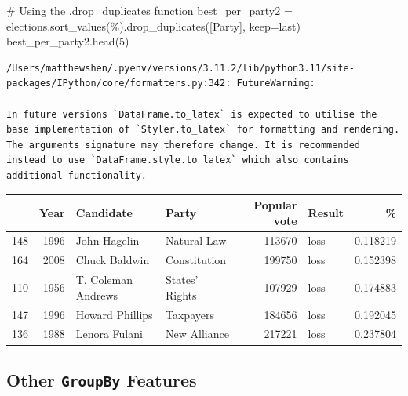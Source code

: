 \documentclass[
  letterpaper,
  DIV=11,
  numbers=noendperiod]{scrreprt}
\newenvironment{Shaded}{\begin{snugshade}}{\end{snugshade}}
\newcommand{\CommentTok}[1]{\textcolor[rgb]{0.37,0.37,0.37}{#1}}
\newcommand{\DecValTok}[1]{\textcolor[rgb]{0.68,0.00,0.00}{#1}}
\newcommand{\NormalTok}[1]{\textcolor[rgb]{0.00,0.23,0.31}{#1}}
\newcommand{\OperatorTok}[1]{\textcolor[rgb]{0.37,0.37,0.37}{#1}}
\newcommand{\StringTok}[1]{\textcolor[rgb]{0.13,0.47,0.30}{#1}}
\begin{document}
\begin{Shaded}
\begin{Highlighting}[]
\CommentTok{\# Using the .drop\_duplicates function}
\NormalTok{best\_per\_party2 }\OperatorTok{=}\NormalTok{ elections.sort\_values(}\StringTok{\textquotesingle{}\%\textquotesingle{}}\NormalTok{).drop\_duplicates([}\StringTok{\textquotesingle{}Party\textquotesingle{}}\NormalTok{], keep}\OperatorTok{=}\StringTok{\textquotesingle{}last\textquotesingle{}}\NormalTok{)}
\NormalTok{best\_per\_party2.head(}\DecValTok{5}\NormalTok{)}
\end{Highlighting}
\end{Shaded}

\begin{verbatim}
/Users/matthewshen/.pyenv/versions/3.11.2/lib/python3.11/site-packages/IPython/core/formatters.py:342: FutureWarning:

In future versions `DataFrame.to_latex` is expected to utilise the base implementation of `Styler.to_latex` for formatting and rendering. The arguments signature may therefore change. It is recommended instead to use `DataFrame.style.to_latex` which also contains additional functionality.
\end{verbatim}

\begin{tabular}{lrllrlr}
\toprule
{} &  Year &           Candidate &           Party &  Popular vote & Result &         \% \\
\midrule
148 &  1996 &        John Hagelin &     Natural Law &        113670 &   loss &  0.118219 \\
164 &  2008 &       Chuck Baldwin &    Constitution &        199750 &   loss &  0.152398 \\
110 &  1956 &  T. Coleman Andrews &  States' Rights &        107929 &   loss &  0.174883 \\
147 &  1996 &     Howard Phillips &       Taxpayers &        184656 &   loss &  0.192045 \\
136 &  1988 &       Lenora Fulani &    New Alliance &        217221 &   loss &  0.237804 \\
\bottomrule
\end{tabular}

\hypertarget{other-groupby-features}{%
\subsection{\texorpdfstring{Other \texttt{GroupBy}
Features}{Other GroupBy Features}}\label{other-groupby-features}}
\end{document}
